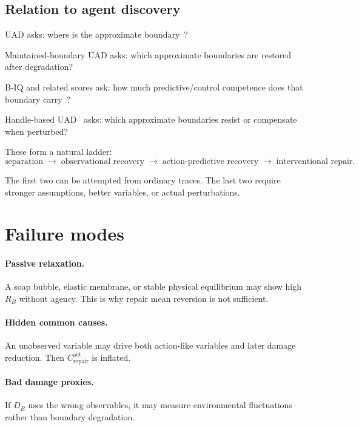 \documentclass[11pt]{article}
\begin{document}
\subsection{Relation to agent discovery}

UAD asks: where is the approximate boundary~\cite{uad2025}?

Maintained-boundary UAD asks: which approximate boundaries are restored after degradation?

B-IQ and related scores ask: how much predictive/control competence does that boundary carry~\cite{biq2025}?

Handle-based UAD~\cite{acc2025} asks: which approximate boundaries resist or compensate when perturbed?

These form a natural ladder:
\begin{equation}
  \text{separation}
  \;\rightarrow\;
  \text{observational recovery}
  \;\rightarrow\;
  \text{action-predictive recovery}
  \;\rightarrow\;
  \text{interventional repair}.
\end{equation}

The first two can be attempted from ordinary traces. The last two require stronger assumptions, better variables, or actual perturbations.

\section{Failure modes}

\paragraph{Passive relaxation.}
A soap bubble, elastic membrane, or stable physical equilibrium may show high $R_B$ without agency. This is why repair mean reversion is not sufficient.

\paragraph{Hidden common causes.}
An unobserved variable may drive both action-like variables and later damage reduction. Then $C_{\mathrm{repair}}^{\mathrm{act}}$ is inflated.

\paragraph{Bad damage proxies.}
If $D_B$ uses the wrong observables, it may measure environmental fluctuations rather than boundary degradation.
\end{document}
